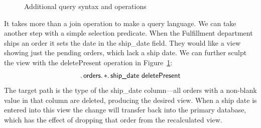 \documentclass[english,submission]{programming}
\theoremstyle{definition}
\begin{document}
\begin{figure}
  \caption{Additional query syntax and operations}
  \label{fig:query-addons}
\end{figure}

It takes more than a join operation to make a query language. We can take another step with a simple selection predicate. When the Fulfillment department ships an order it sets the date in the \textsf{ship\_date} field. They would like a view showing just the pending orders, which lack a ship date. We can further sculpt the view with the \textsf{deletePresent} operation in Figure~\ref{fig:query-addons}:
\[
\ldotp \textsf{orders}\ldotp * \ldotp \textsf{ship\_date deletePresent} \\
\]
The target path is the type of the \textsf{ship\_date} column---all orders with a non-blank value in that column are deleted, producing the desired view. When a ship date is entered into this view the change will transfer back into the primary database, which has the effect of dropping that order from the recalculated view.
\end{document}
